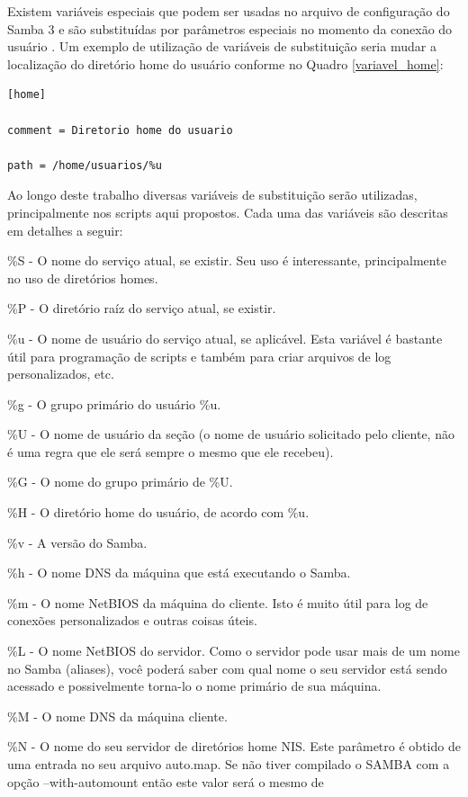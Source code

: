 Existem variáveis especiais que podem ser usadas no arquivo de configuração do Samba 3 e são substituídas por parâmetros especiais no momento da conexão do usuário \cite{FOCA}. Um exemplo de utilização de variáveis de substituição seria mudar a localização do diretório home do usuário conforme no Quadro \ref{variavel_home}:\\

\begin{lstlisting}[caption=Exemplo de utilização das variáveis de substituição,label={variavel_home}]	
[home]
	
comment = Diretorio home do usuario

path = /home/usuarios/%u
\end{lstlisting}          

Ao longo deste trabalho diversas variáveis de substituição serão utilizadas, principalmente nos scripts aqui propostos. Cada uma das variáveis são descritas em detalhes a seguir:

\%S - O nome do serviço atual, se existir. Seu uso é interessante, principalmente no uso de diretórios homes.

\%P - O diretório raíz do serviço atual, se existir.

\%u - O nome de usuário do serviço atual, se aplicável. Esta variável é bastante útil para programação de scripts e também para criar arquivos de log personalizados, etc.

\%g - O grupo primário do usuário \%u.

\%U - O nome de usuário da seção (o nome de usuário solicitado pelo cliente, não é uma regra que ele será sempre o mesmo que ele recebeu).

\%G - O nome do grupo primário de \%U.

\%H - O diretório home do usuário, de acordo com \%u.

\%v - A versão do Samba.

\%h - O nome DNS da máquina que está executando o Samba.

\%m - O nome NetBIOS da máquina do cliente. Isto é muito útil para log de conexões personalizados e outras coisas úteis.

\%L - O nome NetBIOS do servidor. Como o servidor pode usar mais de um nome no Samba (aliases), você poderá saber com qual nome o seu servidor está sendo acessado e possivelmente torna-lo o nome primário de sua máquina.

\%M - O nome DNS da máquina cliente.

\%N - O nome do seu servidor de diretórios home NIS. Este parâmetro é obtido de uma entrada no seu arquivo auto.map. Se não tiver compilado o SAMBA com a opção --with-automount então este valor será o mesmo de %

